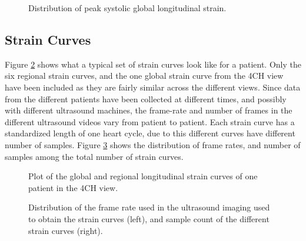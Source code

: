 \begin{figure}
    \centering
    
    \caption{Distribution of peak systolic global longitudinal strain.}
    \label{fig:gls_dist}
\end{figure}

\clearpage

\subsection{Strain Curves}
Figure \ref{fig:strain_curves} shows what a typical set of strain curves look like for a patient. Only the six regional strain curves, and the one global strain curve from the 4CH view have been included as they are fairly similar across the different views. Since data from the different patients have been collected at different times, and possibly with different ultrasound machines, the frame-rate and number of frames in the different ultrasound videos vary from patient to patient. Each strain curve has a standardized length of one heart cycle, due to this different curves have different number of samples. Figure \ref{fig:fr_sample_dist} shows the distribution of frame rates, and number of samples among the total number of strain curves. \bigskip

\begin{figure}[h]
    \centering
    
    \caption{Plot of the global and regional longitudinal strain curves of one patient in the 4CH view.}
    \label{fig:strain_curves}
\end{figure}

\begin{figure}
    \centering
    
    \caption{Distribution of the frame rate used in the ultrasound imaging used to obtain the strain curves (left), and sample count of the different strain curves (right).}
    \label{fig:fr_sample_dist}
\end{figure}

\newpage


